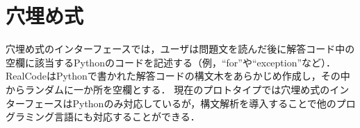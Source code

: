 % 
\section{穴埋め式}

穴埋め式のインターフェースでは，ユーザは問題文を読んだ後に解答コード中の空欄に該当するPythonのコードを記述する（例，``for''や``exception''など）．
RealCodeはPythonで書かれた解答コードの構文木をあらかじめ作成し，その中からランダムに一か所を空欄とする．
現在のプロトタイプでは穴埋め式のインターフェースはPythonのみ対応しているが，構文解析を導入することで他のプログラミング言語にも対応することができる．


